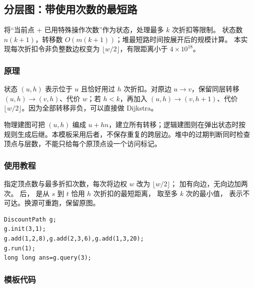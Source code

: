 \subsection{分层图：带使用次数的最短路}
\label{algo:layered-path}
\AlgorithmInfo
    {将“当前点 + 已用特殊操作次数”作为状态，处理最多 $k$ 次折扣等限制。}
    {状态数 $n(k+1)$，转移数 $O(m(k+1))$；堆最短路时间按展开后的规模计算。}
    {本实现每次折扣令非负整数边权变为 $\lfloor w/2\rfloor$，有限距离小于 $4\times10^{18}$。}

\subsubsection*{原理}
状态 $(u,h)$ 表示位于 $u$ 且恰好用过 $h$ 次折扣。对原边 $u\to v$，保留同层转移 $(u,h)\to(v,h)$、代价 $w$；若 $h<k$，再加入 $(u,h)\to(v,h+1)$、代价 $\lfloor w/2\rfloor$。因为全部转移非负，可以直接做 Dijkstra。

物理建图可把 $(u,h)$ 编成 $u+hn$，建立所有转移；逻辑建图则在弹出状态时按规则生成后继。本模板采用后者，不保存重复的跨层边。堆中的过期判断同时检查顶点与层数，不能只给每个原顶点设一个访问标记。

\subsubsection*{使用教程}
 指定顶点数与最多折扣次数，每次将边权 $w$ 改为 $\lfloor w/2\rfloor$； 加有向边，无向边加两次。 后， 是从 $s$ 到 $t$ 恰用 $h$ 次折扣的最短距离， 取至多 $k$ 次的最小值， 表示不可达。换源可重跑，保留原图。
\begin{lstlisting}[style=mtycpp,numbers=none]
DiscountPath g;
g.init(3,1);
g.add(1,2,8),g.add(2,3,6),g.add(1,3,20);
g.run(1);
long long ans=g.query(3);
\end{lstlisting}

\subsubsection*{模板代码}
